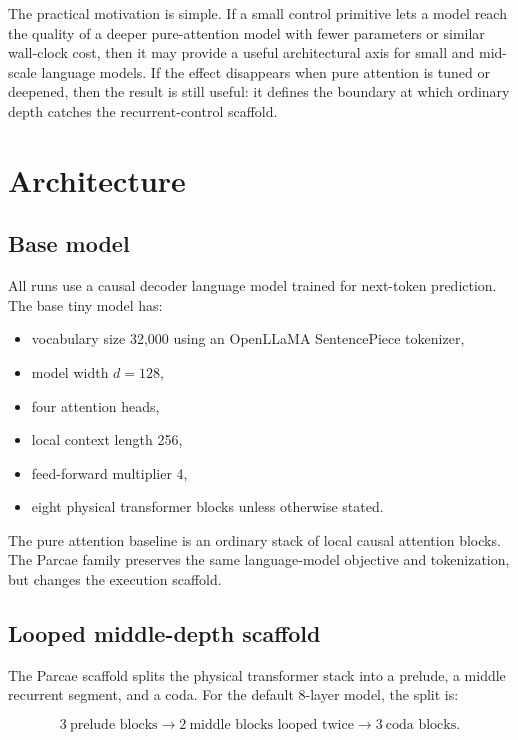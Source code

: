 \documentclass[11pt]{article}
\newcommand{\parcae}{Parcae}
\begin{document}
The practical motivation is simple. If a small control primitive lets a model
reach the quality of a deeper pure-attention model with fewer parameters or
similar wall-clock cost, then it may provide a useful architectural axis for
small and mid-scale language models. If the effect disappears when pure
attention is tuned or deepened, then the result is still useful: it defines the
boundary at which ordinary depth catches the recurrent-control scaffold.

\section{Architecture}

\subsection{Base model}

All runs use a causal decoder language model trained for next-token prediction.
The base tiny model has:

\begin{itemize}
  \item vocabulary size 32,000 using an OpenLLaMA SentencePiece tokenizer,
  \item model width $d=128$,
  \item four attention heads,
  \item local context length 256,
  \item feed-forward multiplier 4,
  \item eight physical transformer blocks unless otherwise stated.
\end{itemize}

The pure attention baseline is an ordinary stack of local causal attention
blocks. The \parcae{} family preserves the same language-model objective and
tokenization, but changes the execution scaffold.

\subsection{Looped middle-depth scaffold}

The \parcae{} scaffold splits the physical transformer stack into a prelude, a
middle recurrent segment, and a coda. For the default 8-layer model, the split
is:

\[
  3\ \text{prelude blocks}
  \rightarrow
  2\ \text{middle blocks looped twice}
  \rightarrow
  3\ \text{coda blocks}.
\]
\end{document}
